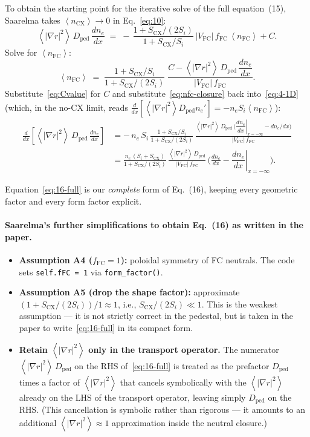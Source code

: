 \documentclass[11pt]{article}
\renewcommand{\ne}{n_{e}}  %
\newcommand{\nfc}{n_{\mathrm{FC}}}
\newcommand{\ncx}{n_{\mathrm{CX}}}
\newcommand{\Vfc}{\lvert V_{\mathrm{FC}}\rvert}
\newcommand{\Si}{S_{i}}
\newcommand{\Scx}{S_{\mathrm{CX}}}
\newcommand{\Dped}{D_{\mathrm{ped}}}
\newcommand{\fFC}{f_{\mathrm{FC}}}
\newcommand{\fsa}[1]{\left\langle #1 \right\rangle}
\newcommand{\gradrsq}{\fsa{|\nabla r|^{2}}}
\newcommand{\neginf}{x=-\infty}
\newcommand{\dneneg}{\left.\dfrac{d\ne}{dx}\right|_{\neginf}}
\begin{document}
To obtain the starting point for the iterative solve of the full
equation~(15), Saarelma takes $\fsa{\ncx}\to 0$ in Eq.~\eqref{eq:10}:
\begin{equation}
  \gradrsq\,\Dped\,\frac{d\ne}{dx}
    \;=\; -\,\frac{1+\Scx/(2\Si)}{1+\Scx/\Si}\,\Vfc\,\fFC\,\fsa{\nfc} + C.
  \label{eq:10-noCX}
\end{equation}
Solve for $\fsa{\nfc}$:
\begin{equation}
  \fsa{\nfc}
    \;=\; \frac{1+\Scx/\Si}{1+\Scx/(2\Si)}\;
          \frac{C - \gradrsq\,\Dped\,\dfrac{d\ne}{dx}}{\Vfc\,\fFC}.
  \label{eq:nfc-closure}
\end{equation}
Substitute~\eqref{eq:Cvalue} for $C$ and substitute~\eqref{eq:nfc-closure}
back into~\eqref{eq:4-1D} (which, in the no-CX limit, reads
$\tfrac{d}{dx}[\gradrsq\Dped\ne'] = -\ne\Si\fsa{\nfc}$):
\begin{align}
  \frac{d}{dx}\!\left[\gradrsq\,\Dped\,\frac{d\ne}{dx}\right]
    &= -\,\ne\,\Si\,\frac{1+\Scx/\Si}{1+\Scx/(2\Si)}\,
         \frac{\gradrsq\,\Dped\,\bigl(\dneneg - d\ne/dx\bigr)}{\Vfc\,\fFC} \\[4pt]
    &= \frac{\ne\,(\Si+\Scx)}{1+\Scx/(2\Si)}\,
       \frac{\gradrsq\,\Dped}{\Vfc\,\fFC}\,\bigl(\tfrac{d\ne}{dx} - \dneneg\bigr).
  \label{eq:16-full}
\end{align}

Equation~\eqref{eq:16-full} is our \emph{complete} form of Eq.~(16),
keeping every geometric factor and every form factor explicit.

\paragraph{Saarelma's further simplifications to obtain Eq.~(16) as written
in the paper.}
\begin{itemize}
  \item \textbf{Assumption A4 ($\fFC=1$):} poloidal symmetry of FC
        neutrals.  The code sets \texttt{self.fFC = 1} via
        \texttt{form\_factor()}.
  \item \textbf{Assumption A5 (drop the shape factor):} approximate
        $(1+\Scx/(2\Si))/1 \approx 1$, i.e., $\Scx/(2\Si)\ll 1$.  This is
        the weakest assumption --- it is not strictly correct in the
        pedestal, but is taken in the paper to write~\eqref{eq:16-full} in
        its compact form.
  \item \textbf{Retain $\gradrsq$ only in the transport operator.}  The
        numerator $\gradrsq\,\Dped$ on the RHS of~\eqref{eq:16-full} is
        treated as the prefactor $\Dped$ times a factor of $\gradrsq$ that
        cancels symbolically with the $\gradrsq$ already on the LHS of the
        transport operator, leaving simply $\Dped$ on the RHS.  (This
        cancellation is symbolic rather than rigorous --- it amounts to an
        additional $\gradrsq\approx 1$ approximation inside the neutral
        closure.)
\end{itemize}
\end{document}
